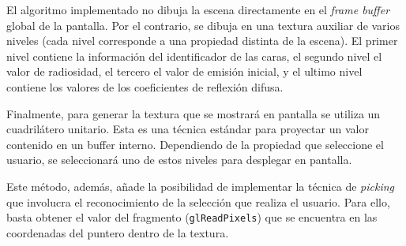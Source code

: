 El algoritmo implementado no dibuja la escena directamente en el \textit{frame buffer} global de la pantalla. Por el contrario, se dibuja en una textura auxiliar de varios niveles (cada nivel corresponde a una propiedad distinta de la escena). El primer nivel contiene la información del identificador de las caras, el segundo nivel el valor de radiosidad, el tercero el valor de emisión inicial, y el ultimo nivel contiene los valores de los coeficientes de reflexión difusa.

Finalmente, para generar la textura que se mostrará en pantalla se utiliza un cuadrilátero unitario. Esta es una técnica estándar para proyectar un valor contenido en un buffer interno. Dependiendo de la propiedad que seleccione el usuario, se seleccionará uno de estos niveles para desplegar en pantalla.

Este método, además, añade la posibilidad de implementar la técnica de \textit{picking} que involucra el reconocimiento de la selección que realiza el usuario. Para ello, basta obtener el valor del fragmento (\verb|glReadPixels|) que se encuentra en las coordenadas del puntero dentro de la textura.

